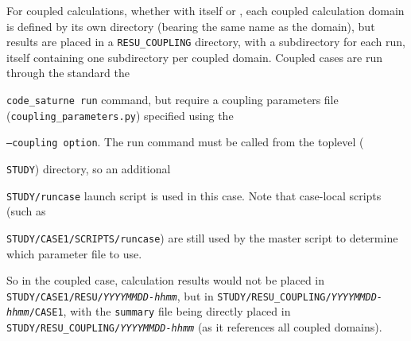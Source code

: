 For coupled calculations, whether with \CS itself or \syrthes, each coupled
calculation domain is defined by its own directory (bearing the same name
as the domain), but results are placed in a \texttt{RESU\_COUPLING}
directory, with a subdirectory for each run, itself containing one
subdirectory per coupled domain. Coupled cases are run through
the standard the {\texttt{code\_saturne run} command, but require a coupling
parameters file (\texttt{coupling\_parameters.py}) specified using the
{\texttt{--coupling option}. The run command must be called from the toplevel
({\texttt{STUDY}) directory, so an additional {\texttt{STUDY/runcase} launch
script is used in this case. Note that case-local scripts (such as
{\texttt{STUDY/CASE1/SCRIPTS/runcase}) are still used by the master script to
determine which parameter file to use.

So in the coupled case, calculation results would not be placed in
\texttt{STUDY/CASE1/RESU/}\emph{\texttt{YYYYMMDD-hhmm}}, but in
\texttt{STUDY/RESU\_COUPLING/}\emph{\texttt{YYYYMMDD-hhmm}}\texttt{/CASE1}, with the \texttt{summary}
file being directly placed in \texttt{STUDY/RESU\_COUPLING/}\emph{\texttt{YYYYMMDD-hhmm}}
(as it references all coupled domains).

}}}}}
